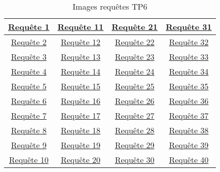 \documentclass{report}
\begin{document}
\begin{table}[H]
	\center
	\begin{tabular}{|c|c|c|c|}
		\hline
		\href{run:./Images/TP6/tp6_1.png}{Requête 1} & \href{run:./Images/TP6/tp6_11.png}{Requête 11} & \href{run:./Images/TP6/tp6_21.png}{Requête 21} & \href{run:./Images/TP6/tp6_31.png}{Requête 31} \\ 
		\hline
		\href{run:./Images/TP6/activites.png}{Requête 2} & \href{run:./Images/TP6/tp6_12.png}{Requête 12} & \href{run:./Images/TP6/tp6_22.png}{Requête 22} & \href{run:./Images/TP6/tp6_32.png}{Requête 32} \\ 
		\hline
		\href{run:./Images/TP6/tp6_3.png}{Requête 3} & \href{run:./Images/TP6/tp6_13.png}{Requête 13} & \href{run:./Images/TP6/tp6_23.png}{Requête 23} & \href{run:./Images/TP6/tp6_33.png}{Requête 33} \\ 
		\hline
		\href{run:./Images/TP6/tp6_4.png}{Requête 4} & \href{run:./Images/TP6/tp6_14.png}{Requête 14} & \href{run:./Images/TP6/tp6_24.png}{Requête 24} & \href{run:./Images/TP6/tp6_34.png}{Requête 34} \\ 
		\hline
		\href{run:./Images/TP6/tp6_5.png}{Requête 5} & \href{run:./Images/TP6/tp6_15.png}{Requête 15} & \href{run:./Images/TP6/tp6_25.png}{Requête 25} & \href{run:./Images/TP6/tp6_35.png}{Requête 35} \\ 
		\hline
		\href{run:./Images/TP6/tp6_6.png}{Requête 6} & \href{run:./Images/TP6/tp6_16.png}{Requête 16} & \href{run:./Images/TP6/tp6_26.png}{Requête 26} & \href{run:./Images/TP6/tp6_36.png}{Requête 36} \\ 
		\hline
		\href{run:./Images/TP6/tp6_7.png}{Requête 7} & \href{run:./Images/TP6/tp6_17.png}{Requête 17} & \href{run:./Images/TP6/tp6_27.png}{Requête 27} & \href{run:./Images/TP6/tp6_37.png}{Requête 37} \\ 
		\hline
		\href{run:./Images/TP6/tp6_8.png}{Requête 8} & \href{run:./Images/TP6/tp6_18.png}{Requête 18} & \href{run:./Images/TP6/tp6_28.png}{Requête 28} & \href{run:./Images/TP6/tp6_38.png}{Requête 38} \\ 
		\hline
		\href{run:./Images/TP6/tp6_9.png}{Requête 9} & \href{run:./Images/TP6/tp6_19.png}{Requête 19} & \href{run:./Images/TP6/tp6_29.png}{Requête 29} & \href{run:./Images/TP6/tp6_39.png}{Requête 39} \\ 
		\hline
		\href{run:./Images/TP6/tp6_10.png}{Requête 10} & \href{run:./Images/TP6/tp6_20.png}{Requête 20} & \href{run:./Images/TP6/tp6_30.png}{Requête 30} & \href{run:./Images/TP6/tp6_40.png}{Requête 40} \\ 
		\hline
	\end{tabular}
	\caption{Images requêtes TP6}
\end{table}
\end{document}
